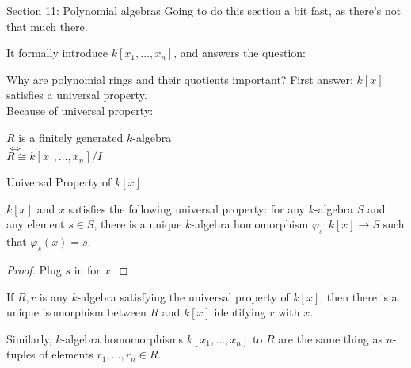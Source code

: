 \documentclass{beamer}
\begin{document}
\begin{frame}{Section 11: Polynomial algebras}
  Going to do this section a bit fast, as there's not that much there.

It formally introduce $k[x_1,\dots, x_n]$, and answers the question:
  \begin{block}{Why are polynomial rings and their quotients important?}
First answer: $k[x]$ satisfies a universal property. \\
    Because of universal property:

      \begin{center}
      \begin{huge}
        $R$ is a finitely generated $k$-algebra \\
        $\iff$ \\
        $R\cong k[x_1,\dots, x_n]/I$ 
        \end{huge}
      \end{center}
    \end{block}


\end{frame}

\begin{frame}{Universal Property of $k[x]$}
  \begin{lemma}$k[x]$  and $x$ satisfies the following universal property: for any $k$-algebra $S$ and any element $s\in S$, there is a unique $k$-algebra homomorphism $\varphi_s:k[x]\to S$ such that $\varphi_s(x)=s$.
  \end{lemma}
  \begin{proof}
    Plug $s$ in for $x$.
  \end{proof}
  \begin{lemma} If $R,r$ is any $k$-algebra satisfying the universal property of $k[x]$, then there is a unique isomorphism between $R$ and $k[x]$ identifying $r$ with $x$.
  \end{lemma}
Similarly, $k$-algebra homomorphisms $k[x_1,\dots, x_n]$ to $R$ are the same thing as $n$-tuples of elements $r_1,\dots, r_n\in R$.
\end{frame}
\end{document}
